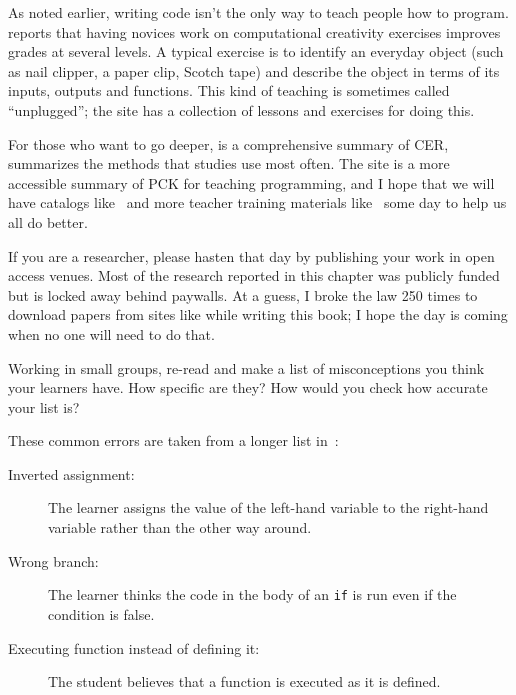 As noted earlier, writing code isn't the only way to teach people how to program. \cite{Shel2017} reports that having novices work on computational creativity exercises improves grades at several levels. A typical exercise is to identify an everyday object (such as nail clipper, a paper clip, Scotch tape) and describe the object in terms of its inputs, outputs and functions. This kind of teaching is sometimes called ``unplugged''; the  site has a collection of lessons and exercises for doing this.


For those who want to go deeper,
\cite{Finc2019} is a comprehensive summary of CER,
\cite{Ihan2016} summarizes the methods that studies use most often.
The  site
is a more accessible summary of PCK for teaching programming,
and I hope that we will have catalogs like~\cite{Ojos2015}
and more teacher training materials like~\cite{Hazz2014,Guzd2015a,Sent2018} some day
to help us all do better.

If you are a researcher,
please hasten that day by publishing your work in open access venues.
Most of the research reported in this chapter was publicly funded
but is locked away behind paywalls.
At a guess,
I broke the law 250 times to download papers from sites like 
while writing this book;
I hope the day is coming when no one will need to do that.



Working in small groups,
re-read  and make a list of misconceptions you think your learners have.
How specific are they?
How would you check how accurate your list is?


These common errors are taken from a longer list in~\cite{Sirk2012}:

\begin{description}

\item[Inverted assignment:]
  The learner assigns the value of the left-hand variable to the right-hand variable
  rather than the other way around.

\item[Wrong branch:]
  The learner thinks the code in the body of an \texttt{if} is run
  even if the condition is false.

\item[Executing function instead of defining it:]
  The student believes that a function is executed as it is defined.

\end{description}

